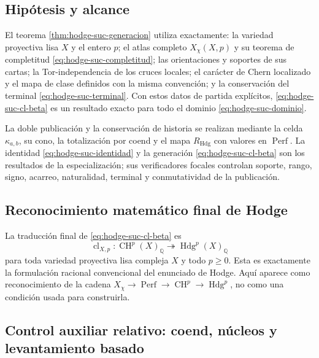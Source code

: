 \subsection*{Hipótesis y alcance}

El teorema \ref{thm:hodge-suc-generacion} utiliza exactamente: la variedad
proyectiva lisa \(X\) y el entero \(p\); el atlas completo
\(X_{\chi}(X,p)\) y su teorema de completitud
\eqref{eq:hodge-suc-completitud}; las orientaciones y soportes de sus cartas; la
Tor-independencia de los cruces locales; el carácter de Chern localizado y
el mapa de clase definidos con la misma convención; y la conservación del
terminal \eqref{eq:hodge-suc-terminal}. Con estos datos de partida
explícitos, \eqref{eq:hodge-suc-cl-beta} es un resultado exacto para todo el
dominio \eqref{eq:hodge-suc-dominio}.

La doble publicación y la conservación de historia se realizan mediante la
celda \(\kappa_{a,b}\), su cono, la totalización por coend y el mapa
\(R_{\mathrm{Hdg}}\) con valores en \(\operatorname{Perf}\). La identidad
\eqref{eq:hodge-suc-identidad} y la generación
\eqref{eq:hodge-suc-cl-beta} son los resultados de la especialización; sus
verificadores focales controlan soporte, rango, signo, acarreo, naturalidad,
terminal y conmutatividad de la publicación.

\subsection{Reconocimiento matemático final de Hodge}

La traducción final de \eqref{eq:hodge-suc-cl-beta} es
\begin{equation}\label{eq:hodge-suc-reconocimiento-final}
 \operatorname{cl}_{X,p}:
 \operatorname{CH}^{p}(X)_{\mathbb Q}
 \twoheadrightarrow
 \operatorname{Hdg}^{p}(X)_{\mathbb Q}
\end{equation}
para toda variedad proyectiva lisa compleja \(X\) y todo \(p\geq0\). Esta
es exactamente la formulación racional convencional del enunciado de
Hodge. Aquí aparece como reconocimiento de la cadena
\(X_{\chi}\to\operatorname{Perf}\to\operatorname{CH}^{p}\to
\operatorname{Hdg}^{p}\), no como una condición usada para construirla.

\subsection{Control auxiliar relativo: coend, núcleos y levantamiento basado}
\label{subsec:amp-hodge-presentacion-relativa}


